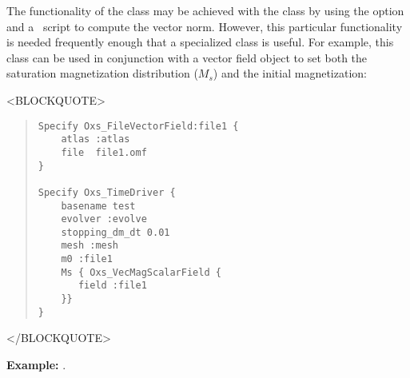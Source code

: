 \begin{description}
The functionality of the  class may be achieved
with the  class by using the
 option and a \Tcl\ script to compute the vector
norm.  However, this particular functionality is needed frequently
enough that a specialized class is useful.  For example, this class can
be used in conjunction with a vector field object to set
both the saturation magnetization distribution ($M_s$) and the initial
magnetization:
\begin{rawhtml}<BLOCKQUOTE>\end{rawhtml}
\begin{quote}
\begin{verbatim}
Specify Oxs_FileVectorField:file1 {
    atlas :atlas
    file  file1.omf
}

Specify Oxs_TimeDriver {
    basename test
    evolver :evolve
    stopping_dm_dt 0.01
    mesh :mesh
    m0 :file1
    Ms { Oxs_VecMagScalarField {
       field :file1
    }}
}
\end{verbatim}
\end{quote}
\begin{rawhtml}</BLOCKQUOTE>\end{rawhtml}

\textbf{Example:} .


\end{description}
